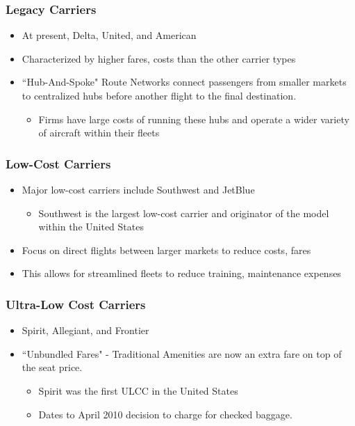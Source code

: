 \documentclass[xcolor=dvipsnames]{beamer}
\begin{document}
	\begin{frame}
		\frametitle{Legacy Carriers}
		\begin{itemize}
			\item At present, Delta, United, and American
			\item Characterized by higher fares, costs than the other carrier types
			\item ``Hub-And-Spoke" Route Networks connect passengers from smaller markets to centralized hubs before another flight to the final destination.
			\begin{itemize}
				\item Firms have large costs of running these hubs and operate a wider variety of aircraft within their fleets
			\end{itemize}
		\end{itemize}
	\end{frame}
	
	\begin{frame}
		\frametitle{Low-Cost Carriers}
		\begin{itemize}
			\item Major low-cost carriers include Southwest and JetBlue
			\begin{itemize}
				\item Southwest is the largest low-cost carrier and originator of the model within the United States
			\end{itemize}
			\item Focus on  direct flights between larger markets to reduce costs, fares
			\item This allows for streamlined fleets to reduce training, maintenance expenses
		\end{itemize}
	\end{frame}
	
	\begin{frame}
		\frametitle{Ultra-Low Cost Carriers}
		\begin{itemize}
			\item Spirit, Allegiant, and Frontier
			\item ``Unbundled Fares" - Traditional Amenities are now an extra fare on top of the seat price.
			\begin{itemize}
				\item Spirit was the first ULCC in the United States
				\item Dates to April 2010 decision to charge for checked baggage. 
			\end{itemize}
		\end{itemize}
	\end{frame}    
\end{document}
